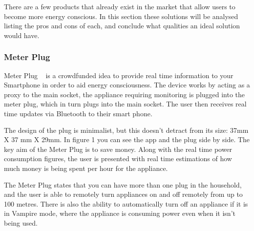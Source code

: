 \documentclass[preprint,12pt,3p]{elsarticle}
\begin{document}
There are a few products that already exist in the market that allow users to become more energy conscious. In this section these solutions will be analysed listing the pros and cons of each, and conclude what qualities an ideal solution would have.

\subsubsection{Meter Plug}

Meter Plug ~\cite{mplug} is a crowdfunded idea to provide real time information to your Smartphone in order to aid energy consciousness. The device works by acting as a proxy to the main socket, the appliance requiring monitoring is plugged into the meter plug, which in turn plugs into the main socket. The user then receives real time updates via Bluetooth to their smart phone.

The design of the plug is minimalist, but this doesn't detract from its size: 37mm X 37 mm X 29mm. In figure 1 you can see the app and the plug side by side. The key aim of the Meter Plug is to save money. Along with the real time power consumption figures, the user is presented with real time estimations of how much money is being spent per hour for the appliance. 

The Meter Plug states that you can have more than one plug in the household, and the user is able to remotely turn appliances on and off remotely from up to 100 metres. There is also the ability to automatically turn off an appliance if it is in Vampire mode, where the appliance is consuming power even when it isn't being used.
\end{document}
